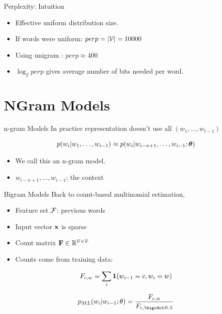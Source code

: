 \documentclass{beamer}
\makeatletter
\newcommand*\bigcdot{\mathpalette\bigcdot@{.5}}
\newcommand*\bigcdot@[2]{\mathbin{\vcenter{\hbox{\scalebox{#2}{$\m@th#1\bullet$}}}}}
\makeatother
\begin{document}
\begin{frame}{Perplexity: Intuition}
  \begin{itemize}
  \item Effective uniform distribution size.
    \air 
  \item If words were uniform: $perp = |\mathcal{V}| = 10000$
    \air 
    
  \item Using unigram : $perp \approx 400$
    \air 

  \item $\log_2 perp$ gives average number of bits needed per word.
  \end{itemize}
\end{frame}

\section{NGram Models}

\begin{frame}{n-gram Models}
  In practice representation doesn't use all $(w_1, \ldots, w_{t-1})$

  \[p(w_i | w_1, \ldots, w_{i-1}) \approx p(w_i | w_{i - n +1}, \ldots, w_{i-1}; \boldsymbol{\theta}) \]
  
  \begin{itemize}
  \item   We call this an n-gram model.
  \item   $w_{i - n +1}, \ldots, w_{i-1}$; the context
  \end{itemize}
\end{frame}


\begin{frame}{Bigram Models}
  Back to count-based multinomial estimation, 
  \begin{itemize}
  \item Feature set $\mathcal{F}$: previous words
  \item Input vector $\mathbf{x}$ is sparse
  \item Count matrix $\mathbf{F} \in \mathbb{R}^{\mathcal{V} \times \mathcal{V}}$ 
  \item Counts come from training data:
  \end{itemize}

  \[ F_{c, w}  = \sum_{i} \mathbf{1}(w_{i-1} = c, w_i = w)  \]

  \[p_{ML}(w_i | w_{i-1};\theta) = \frac{F_{c, w}}{F_{c, \bigcdot}} \]
\end{frame}
\end{document}
